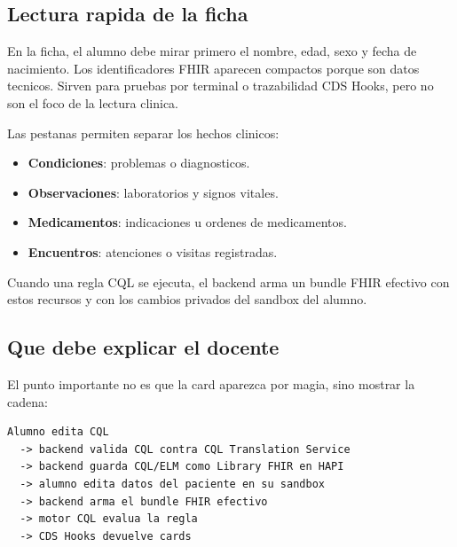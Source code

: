 \subsection{Lectura rapida de la ficha}

En la ficha, el alumno debe mirar primero el nombre, edad, sexo y fecha de
nacimiento. Los identificadores FHIR aparecen compactos porque son datos
tecnicos. Sirven para pruebas por terminal o trazabilidad CDS Hooks, pero no son
el foco de la lectura clinica.

Las pestanas permiten separar los hechos clinicos:

\begin{itemize}
  \item \textbf{Condiciones}: problemas o diagnosticos.
  \item \textbf{Observaciones}: laboratorios y signos vitales.
  \item \textbf{Medicamentos}: indicaciones u ordenes de medicamentos.
  \item \textbf{Encuentros}: atenciones o visitas registradas.
\end{itemize}

Cuando una regla CQL se ejecuta, el backend arma un bundle FHIR efectivo con
estos recursos y con los cambios privados del sandbox del alumno.

\subsection{Que debe explicar el docente}

El punto importante no es que la card aparezca por magia, sino mostrar la cadena:

\begin{lstlisting}
Alumno edita CQL
  -> backend valida CQL contra CQL Translation Service
  -> backend guarda CQL/ELM como Library FHIR en HAPI
  -> alumno edita datos del paciente en su sandbox
  -> backend arma el bundle FHIR efectivo
  -> motor CQL evalua la regla
  -> CDS Hooks devuelve cards
\end{lstlisting}
